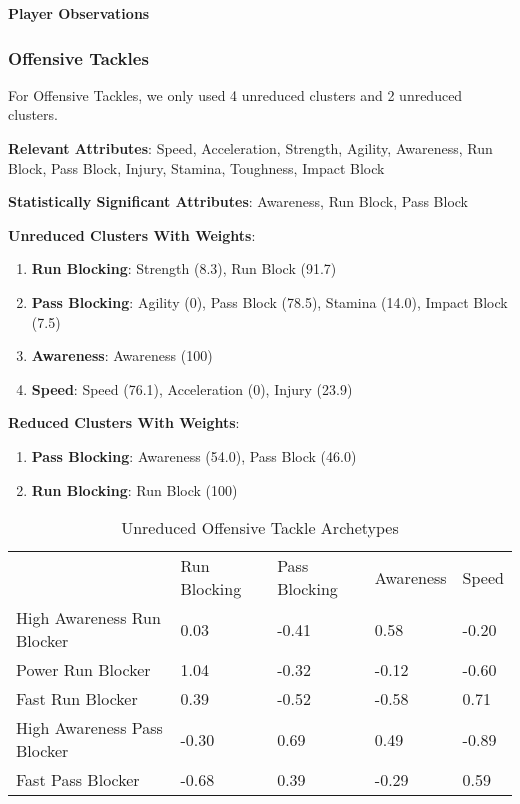 \documentclass[11pt]{article}
\begin{document}
\textbf{Player Observations}


\subsubsection{Offensive Tackles}

For Offensive Tackles, we only used 4 unreduced clusters and 2 unreduced clusters.

\textbf{Relevant Attributes}: Speed, Acceleration, Strength, Agility, Awareness, Run Block, Pass Block, Injury, Stamina, Toughness, Impact Block

\textbf{Statistically Significant Attributes}: Awareness, Run Block, Pass Block

\textbf{Unreduced Clusters With Weights}:

\begin{enumerate}
\item{\textbf{Run Blocking}}: Strength (8.3), Run Block (91.7)
\item{\textbf{Pass Blocking}}: Agility (0), Pass Block (78.5), Stamina (14.0), Impact Block (7.5)
\item{\textbf{Awareness}}: Awareness (100)
\item{\textbf{Speed}}: Speed (76.1), Acceleration (0), Injury (23.9)
\end{enumerate}

\textbf{Reduced Clusters With Weights}:

\begin{enumerate}
\item{\textbf{Pass Blocking}}: Awareness (54.0), Pass Block (46.0)
\item{\textbf{Run Blocking}}: Run Block (100)
\end{enumerate}

\begin{table}[]
\centering
\caption{Unreduced Offensive Tackle Archetypes}
\label{UnreducedOffensiveTackle}
\begin{tabular}{lllll}
                            & Run Blocking & Pass Blocking & Awareness & Speed \\
High Awareness Run Blocker  & 0.03         & -0.41         & 0.58      & -0.20 \\
Power Run Blocker           & 1.04         & -0.32         & -0.12     & -0.60 \\
Fast Run Blocker            & 0.39         & -0.52         & -0.58     & 0.71  \\
High Awareness Pass Blocker & -0.30        & 0.69          & 0.49      & -0.89 \\
Fast Pass Blocker           & -0.68        & 0.39          & -0.29     & 0.59 
\end{tabular}
\end{table}
\end{document}
